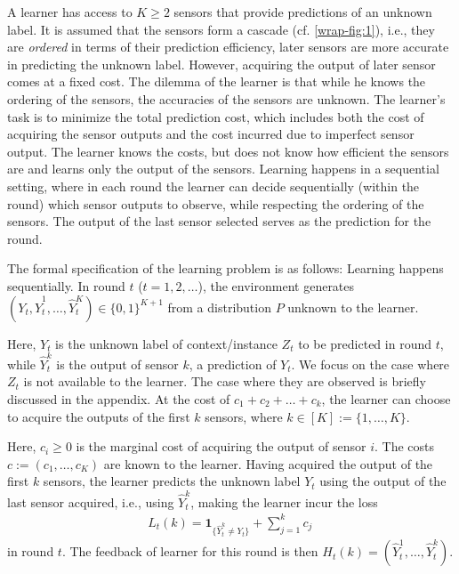 \documentclass[11pt]{article} %
\newcommand{\hY}{\hat{Y}}
\begin{document}
A learner has access to $K\geq 2$ sensors that provide predictions
of an unknown label. 
 It is assumed that the sensors form a cascade (cf. \cref{wrap-fig:1}),
i.e., they are  \emph{ordered} in terms of their prediction efficiency,
later sensors are more accurate in predicting the unknown label.
However, acquiring the output of later sensor comes at a fixed cost.
The dilemma of the learner is that while he knows the ordering of the sensors,
the accuracies of the sensors are unknown.
The learner's task is to minimize the total prediction cost, which includes
both the cost of acquiring the sensor outputs and the cost incurred due to imperfect
sensor output.
The learner knows the costs, but does not know how efficient the sensors are
and learns only the output of the sensors.
Learning happens in a sequential setting, where in each round the learner can decide
sequentially (within the round) which sensor outputs to observe,
while respecting the ordering of the sensors.
The output of the last sensor selected serves as the prediction for the round.

The formal specification of the learning problem is as follows:
Learning happens sequentially.
In round $t$ ($t=1,2,\dots$), 
the environment generates 
$(Y_t,\hY_t^1,\dots,\hY_t^K)\in \{0,1\}^{K+1}$ from a distribution $P$ unknown to the learner.

Here, $Y_t$ is the unknown label of context/instance $Z_t$ to be predicted in round $t$, while $\hY_t^k$ is the output of sensor
$k$, a prediction of $Y_t$. We focus on the case where $Z_t$ is not available to the learner. The case where they are observed is briefly discussed in the appendix. 
At the cost of $c_1+ c_2 + \dots + c_k$,
the learner can choose to acquire the outputs of the first $k$ sensors,
where $k\in [K] := \{1,\dots,K\}$. 

Here, $c_i\ge 0$ is the marginal cost of acquiring the output of sensor $i$.
The costs $c := (c_1,\dots,c_K)$ are known to the learner.
Having acquired the output of the first $k$ sensors, the learner predicts the unknown label $Y_t$ using
the output of the last sensor acquired, i.e., using $\hY_t^k$, making the learner incur the loss
\begin{align*}
L_t(k)=\mathbf{1}_{\{\hat{Y}^k_t\neq Y_t\}}+\sum_{j=1}^k c_j\,
\end{align*}
in round $t$.
The feedback of learner for this round is then $H_t(k)=(\hat{Y}^1_t,\ldots,\hat{Y}^k_t)$.

\end{document}
